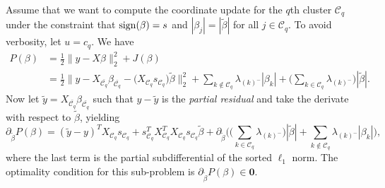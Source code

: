 Assume that we want to compute the coordinate update for the \(q\)th cluster
\(\mathcal{C}_q\) under the constraint that \(\operatorname{sign}(\beta) = s\) and
\(|\beta_j| = |\tilde \beta|\) for all \(j \in \mathcal{C}_q\).
To avoid verbosity, let
\(u = c_q\).
We have
\[
  \begin{aligned}
    P(\beta) & =  \frac{1}{2} \lVert y - X\beta\rVert_2^2 + J(\beta)                                                                                                                                                                                                                                   \\
             & = \frac{1}{2} \lVert y - X_{\bar{\mathcal{C}_q}} \beta_{\bar{\mathcal{C}_q}} - \big(X_{\mathcal{C}_q} s_{\mathcal{C}_q}\big)\tilde\beta  \rVert_2^2 + \sum_{k \notin {\mathcal{C}_q}} \lambda_{(k)^-}|\beta_k| + \bigg(\sum_{k \in {\mathcal{C}_q}} \lambda_{(k)^-}\bigg)|\tilde\beta|.
  \end{aligned}
\]
Now let \(\tilde y = X_{\bar{\mathcal{C}_q}} \beta_{\bar{\mathcal{C}_q}}\)
such that \(y - \tilde y\) is the \emph{partial residual} and take the
derivate with respect to \(\tilde\beta\), yielding
\begin{equation}
  \label{eq:cluster-grad}
  \partial_{\tilde\beta}
  P(\beta) = (\tilde y - y)^T X_{\mathcal{C}_q} s_{\mathcal{C}_q} + s_{\mathcal{C}_q}^T X_{{\mathcal{C}_q}}^T X_{\mathcal{C}_q} s_{\mathcal{C}_q} \tilde\beta + \partial_{\tilde\beta}\Bigg(\bigg(\sum_{k \in {\mathcal{C}_q}} \lambda_{(k)^-}\bigg)|\tilde\beta| + \sum_{k \notin \mathcal{C}_q}\lambda_{(k)^-}|\beta_k|\Bigg),
\end{equation}
where the last term is the partial subdifferential of the sorted \(\ell_1\)
norm. The optimality condition for this sub-problem is \( \partial_{\tilde
\beta} P(\beta) \in \boldsymbol{0}. \)

